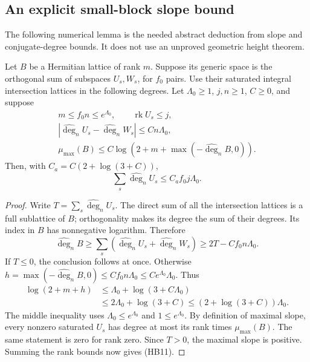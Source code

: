 \subsection{An explicit small-block slope bound}

The following numerical lemma is the needed abstract deduction
from slope and conjugate-degree bounds.
It does not use an unproved geometric height theorem.

\begin{srlemma}\label{lem:sr-hb-small-blocks}
Let \(B\) be a Hermitian lattice of rank \(m\).
Suppose its generic space is the orthogonal sum of subspaces
\(U_s,W_s\), for \(f_0\) pairs.  Use their saturated integral
intersection lattices in the following degrees.
Let \(\Lambda_0\ge1\), \(j,n\ge1\), \(C\ge0\), and suppose
\[
 \begin{gathered}
 m\le f_0n\le e^{\Lambda_0},\qquad
 \operatorname{rk}U_s\le j,\\
 |\widehat{\deg}_nU_s-\widehat{\deg}_nW_s|
                                    \le Cn\Lambda_0,\\
 \mu_{\max}(B)\le C\log(2+m+\max(-\widehat{\deg}_nB,0)).
 \end{gathered}                                      \tag{HB10}
\]
Then, with \(C_a=C(2+\log(3+C))\),
\[
              \sum_s\widehat{\deg}_nU_s
                                \le C_a f_0j\Lambda_0.
 \tag{HB11}\label{eq:sr-hb-small-bound}
\]
\end{srlemma}

\begin{proof}
Write \(T=\sum_s\widehat{\deg}_nU_s\).
The direct sum of all the intersection lattices is a full
sublattice of \(B\); orthogonality makes its degree the sum
of their degrees.  Its index in \(B\) has nonnegative logarithm.
Therefore
\[
 \widehat{\deg}_nB\ge
      \sum_s(\widehat{\deg}_nU_s+\widehat{\deg}_nW_s)
                                  \ge2T-Cf_0n\Lambda_0.
\]
If \(T\le0\), the conclusion follows at once.
Otherwise \(h=\max(-\widehat{\deg}_nB,0)
\le Cf_0n\Lambda_0\le Ce^{\Lambda_0}\Lambda_0\).
Thus
\[
 \begin{split}
 \log(2+m+h)
 &\le\Lambda_0+\log(3+C\Lambda_0)\\
 &\le2\Lambda_0+\log(3+C)
 \le(2+\log(3+C))\Lambda_0.
 \end{split}
\]
The middle inequality uses
\(\Lambda_0\le e^{\Lambda_0}\) and \(1\le e^{\Lambda_0}\).
By definition of maximal slope, every nonzero saturated
\(U_s\) has degree at most its rank times \(\mu_{\max}(B)\).
The same statement is zero for rank zero.
Since \(T>0\), the maximal slope is positive.
Summing the rank bounds now gives (HB11).
\end{proof}

